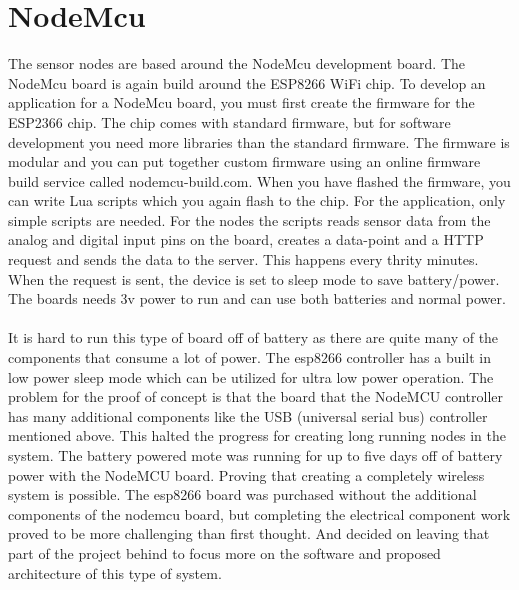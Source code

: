 \documentclass[]{uiophd}
\begin{document}
\section{NodeMcu}
The sensor nodes are based around the NodeMcu development board. The NodeMcu board is again build around the ESP8266 \cite{espressif} WiFi chip. To develop an application for a NodeMcu board, you must first create the firmware for the ESP2366 chip. The chip comes with standard firmware, but for software development you need more libraries than the standard firmware. The firmware is modular and you can put together custom firmware using an online firmware build service called nodemcu-build.com. When you have flashed the firmware, you can write Lua scripts which you again flash to the chip. For the application, only simple scripts are needed. For the nodes the scripts reads sensor data from the analog and digital input pins on the board, creates a data-point and a HTTP request and sends the data to the server. This happens every thrity minutes.  When the request is sent, the device is set to sleep mode to save battery/power. The boards needs 3v power to run and can use both batteries and normal power.
\\\\
It is hard to run this type of board off of battery as there are quite many of the components that consume a lot of power. The esp8266 controller has a built in low power sleep mode which can be utilized for ultra low power operation. The problem for the proof of concept is that the board that the NodeMCU controller has many additional components like the USB (universal serial bus) controller mentioned above. This halted the progress for creating long running nodes in the system. The battery powered mote was running for up to five days off of battery power with the NodeMCU board. Proving that creating a completely wireless system is possible. The esp8266 board was purchased without the additional components of the nodemcu board, but completing the electrical component work proved to be more challenging than first thought. And decided on leaving that part of the project behind to focus more on the software and proposed architecture of this type of system.
\end{document}
